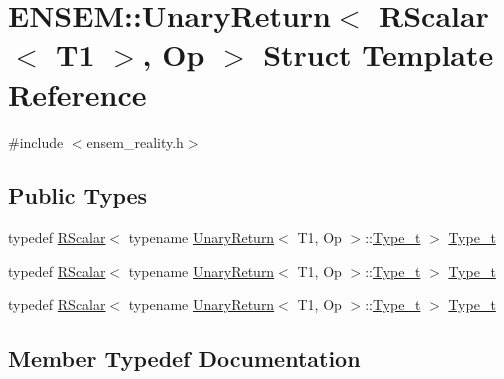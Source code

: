 \hypertarget{structENSEM_1_1UnaryReturn_3_01RScalar_3_01T1_01_4_00_01Op_01_4}{}\section{E\+N\+S\+EM\+:\+:Unary\+Return$<$ R\+Scalar$<$ T1 $>$, Op $>$ Struct Template Reference}
\label{structENSEM_1_1UnaryReturn_3_01RScalar_3_01T1_01_4_00_01Op_01_4}


{\ttfamily \#include $<$ensem\+\_\+reality.\+h$>$}

\subsection*{Public Types}
\begin{DoxyCompactItemize}
\item 
typedef \mbox{\hyperlink{classENSEM_1_1RScalar}{R\+Scalar}}$<$ typename \mbox{\hyperlink{structENSEM_1_1UnaryReturn}{Unary\+Return}}$<$ T1, Op $>$\+::\mbox{\hyperlink{structENSEM_1_1UnaryReturn_3_01RScalar_3_01T1_01_4_00_01Op_01_4_a406bd7c6dcdb1f1ee9e383de2e830d7c}{Type\+\_\+t}} $>$ \mbox{\hyperlink{structENSEM_1_1UnaryReturn_3_01RScalar_3_01T1_01_4_00_01Op_01_4_a406bd7c6dcdb1f1ee9e383de2e830d7c}{Type\+\_\+t}}
\item 
typedef \mbox{\hyperlink{classENSEM_1_1RScalar}{R\+Scalar}}$<$ typename \mbox{\hyperlink{structENSEM_1_1UnaryReturn}{Unary\+Return}}$<$ T1, Op $>$\+::\mbox{\hyperlink{structENSEM_1_1UnaryReturn_3_01RScalar_3_01T1_01_4_00_01Op_01_4_a406bd7c6dcdb1f1ee9e383de2e830d7c}{Type\+\_\+t}} $>$ \mbox{\hyperlink{structENSEM_1_1UnaryReturn_3_01RScalar_3_01T1_01_4_00_01Op_01_4_a406bd7c6dcdb1f1ee9e383de2e830d7c}{Type\+\_\+t}}
\item 
typedef \mbox{\hyperlink{classENSEM_1_1RScalar}{R\+Scalar}}$<$ typename \mbox{\hyperlink{structENSEM_1_1UnaryReturn}{Unary\+Return}}$<$ T1, Op $>$\+::\mbox{\hyperlink{structENSEM_1_1UnaryReturn_3_01RScalar_3_01T1_01_4_00_01Op_01_4_a406bd7c6dcdb1f1ee9e383de2e830d7c}{Type\+\_\+t}} $>$ \mbox{\hyperlink{structENSEM_1_1UnaryReturn_3_01RScalar_3_01T1_01_4_00_01Op_01_4_a406bd7c6dcdb1f1ee9e383de2e830d7c}{Type\+\_\+t}}
\end{DoxyCompactItemize}


\subsection{Member Typedef Documentation}
\mbox{\label{structENSEM_1_1UnaryReturn_3_01RScalar_3_01T1_01_4_00_01Op_01_4_a406bd7c6dcdb1f1ee9e383de2e830d7c}} 
